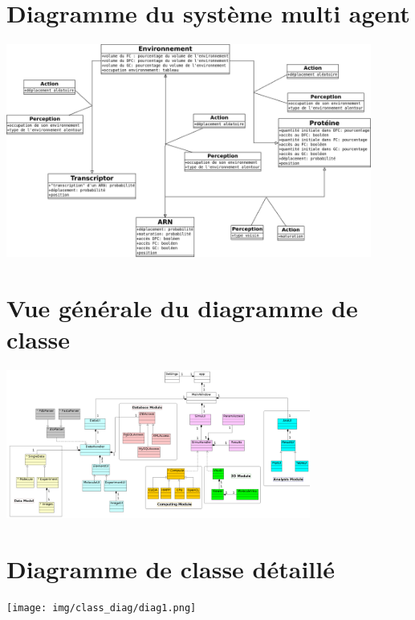 
\section{Diagramme du système multi agent}

\label{diagSMA}
\begin{center}
  \includegraphics[angle=90,width=0.9\textwidth]{img/diagSMA.png}
\end{center}

\section{Vue générale du diagramme de classe}

\label{diag_class}
\begin{center}
  \includegraphics[angle=90,width=0.75\textwidth]{img/class_diag/diag.pdf}
\end{center}

\section{Diagramme de classe détaillé}

\label{diag_class_detail}

\begin{center}
  \texttt{[image: img/class\_diag/diag1.png]}
\end{center}
\newpage

